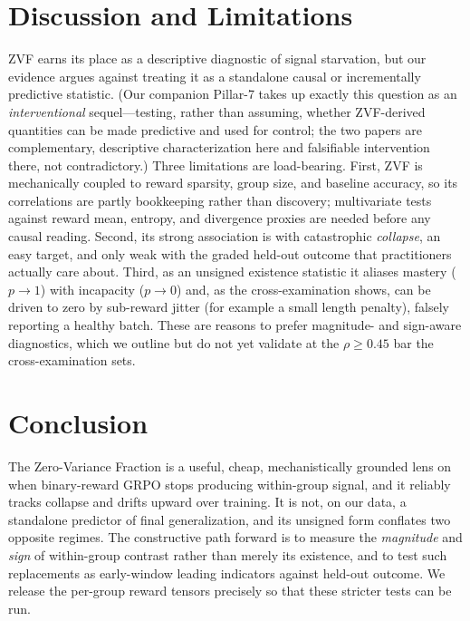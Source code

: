 \section{Discussion and Limitations}
\label{sec:p2-discussion}
ZVF earns its place as a descriptive diagnostic of signal starvation, but our
evidence argues against treating it as a standalone causal or incrementally
predictive statistic. (Our companion Pillar-7 takes up exactly this question as an
\emph{interventional} sequel---testing, rather than assuming, whether ZVF-derived
quantities can be made predictive and used for control; the two papers are
complementary, descriptive characterization here and falsifiable intervention there,
not contradictory.) Three limitations are load-bearing. First, ZVF is
mechanically coupled to reward sparsity, group size, and baseline accuracy, so its
correlations are partly bookkeeping rather than discovery; multivariate tests
against reward mean, entropy, and divergence proxies are needed before any causal
reading. Second, its strong association is with catastrophic \emph{collapse}, an
easy target, and only weak with the graded held-out outcome that practitioners
actually care about. Third, as an unsigned existence statistic it aliases mastery
($p \to 1$) with incapacity ($p \to 0$) and, as the cross-examination shows, can be
driven to zero by sub-reward jitter (for example a small length penalty), falsely
reporting a healthy batch. These are reasons to prefer magnitude- and sign-aware
diagnostics, which we outline but do not yet validate at the $\rho \geq 0.45$ bar
the cross-examination sets.

\section{Conclusion}
\label{sec:p2-conclusion}
The Zero-Variance Fraction is a useful, cheap, mechanistically grounded lens on
when binary-reward GRPO stops producing within-group signal, and it reliably
tracks collapse and drifts upward over training. It is not, on our data, a
standalone predictor of final generalization, and its unsigned form conflates two
opposite regimes. The constructive path forward is to measure the \emph{magnitude}
and \emph{sign} of within-group contrast rather than merely its existence, and to
test such replacements as early-window leading indicators against held-out outcome.
We release the per-group reward tensors precisely so that these stricter tests can
be run.
